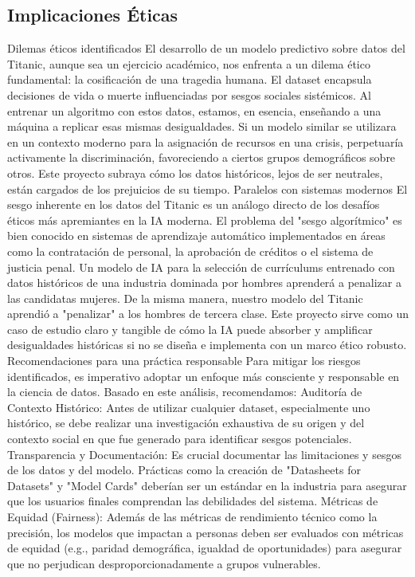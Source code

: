 \documentclass[conference]{IEEEtran}
\begin{document}
\subsection{Implicaciones Éticas}
Dilemas éticos identificados
El desarrollo de un modelo predictivo sobre datos del Titanic, aunque sea un ejercicio académico, nos enfrenta a un dilema ético fundamental: la cosificación de una tragedia humana. El dataset encapsula decisiones de vida o muerte influenciadas por sesgos sociales sistémicos. Al entrenar un algoritmo con estos datos, estamos, en esencia, enseñando a una máquina a replicar esas mismas desigualdades. Si un modelo similar se utilizara en un contexto moderno para la asignación de recursos en una crisis, perpetuaría activamente la discriminación, favoreciendo a ciertos grupos demográficos sobre otros. Este proyecto subraya cómo los datos históricos, lejos de ser neutrales, están cargados de los prejuicios de su tiempo.
Paralelos con sistemas modernos
El sesgo inherente en los datos del Titanic es un análogo directo de los desafíos éticos más apremiantes en la IA moderna. El problema del "sesgo algorítmico" es bien conocido en sistemas de aprendizaje automático implementados en áreas como la contratación de personal, la aprobación de créditos o el sistema de justicia penal. Un modelo de IA para la selección de currículums entrenado con datos históricos de una industria dominada por hombres aprenderá a penalizar a las candidatas mujeres. De la misma manera, nuestro modelo del Titanic aprendió a "penalizar" a los hombres de tercera clase. Este proyecto sirve como un caso de estudio claro y tangible de cómo la IA puede absorber y amplificar desigualdades históricas si no se diseña e implementa con un marco ético robusto.
Recomendaciones para una práctica responsable
Para mitigar los riesgos identificados, es imperativo adoptar un enfoque más consciente y responsable en la ciencia de datos. Basado en este análisis, recomendamos:
Auditoría de Contexto Histórico: Antes de utilizar cualquier dataset, especialmente uno histórico, se debe realizar una investigación exhaustiva de su origen y del contexto social en que fue generado para identificar sesgos potenciales.
Transparencia y Documentación: Es crucial documentar las limitaciones y sesgos de los datos y del modelo. Prácticas como la creación de "Datasheets for Datasets" y "Model Cards" deberían ser un estándar en la industria para asegurar que los usuarios finales comprendan las debilidades del sistema.
Métricas de Equidad (Fairness): Además de las métricas de rendimiento técnico como la precisión, los modelos que impactan a personas deben ser evaluados con métricas de equidad (e.g., paridad demográfica, igualdad de oportunidades) para asegurar que no perjudican desproporcionadamente a grupos vulnerables.
\end{document}
